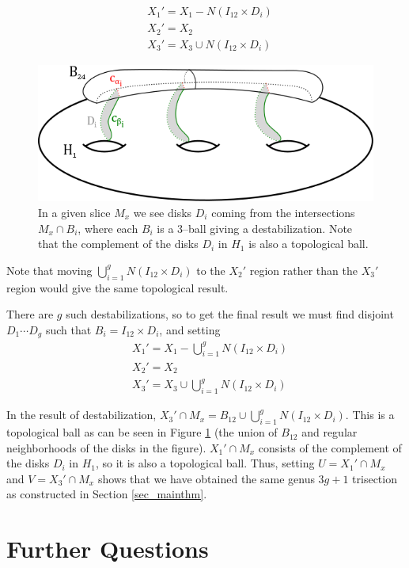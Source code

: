 \documentclass[12pt]{amsart}
\theoremstyle{definition}
\theoremstyle{remark}
\begin{document}
\begin{align*}
&X_1' = X_1 - N(I_{12} \times D_i) \\
&X_2' = X_2\\
&X_3' = X_3 \cup N(I_{12} \times D_i)
\end{align*}

\begin{figure}[h]
\centering
\includegraphics[height=1.8in]{gettingU.png}
\caption{In a given slice $M_x$ we see disks $D_i$ coming from the intersections $M_x \cap B_i$, where each $B_i$ is a 3--ball giving a destabilization.
Note that the complement of the disks $D_i$ in $H_1$ is also a topological ball.
}
\label{getU}
\end{figure}

Note that moving $\bigcup_{i=1}^g N(I_{12} \times D_i)$ to the $X_2'$ region rather than the $X_3'$ region would give the same topological result.

There are $g$ such destabilizations, so to get the final result we must find disjoint $D_1 \cdots D_g$ such that $B_i = I_{12} \times D_i$, and setting
\begin{align*}
&X_1' = X_1 - \bigcup_{i=1}^g N(I_{12} \times D_i) \\
&X_2' = X_2\\
&X_3' = X_3 \cup \bigcup_{i=1}^g N(I_{12} \times D_i)
\end{align*}

In the result of destabilization, $X_3' \cap M_x = B_{12} \cup \bigcup_{i=1}^g N(I_{12} \times D_i)$.
This is a topological ball as can be seen in Figure \ref{getU} (the union of $B_{12}$ and regular neighborhoods of the disks in the figure).
$X_1' \cap M_x$ consists of the complement of the disks $D_i$ in $H_1$, so it is also a topological ball.
Thus, setting $U=X_1' \cap M_x$ and $V = X_3' \cap M_x$ shows that we have obtained the same genus $3g+1$ trisection as constructed in Section \ref{sec_mainthm}.


\section{Further Questions}
\label{sec_questions}
\end{document}
